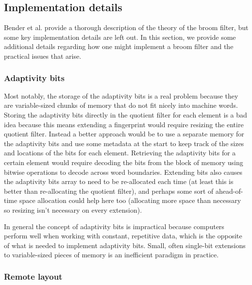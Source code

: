 \documentclass[../paper.tex]{subfiles}
\begin{document}
\subsection{Implementation details}

Bender et al. \cite{broom-filter} provide a thorough description of the theory of
the broom filter, but some key implementation details are left out. In this section,
we provide some additional details regarding how one might implement a broom filter
and the practical issues that arise.

\subsubsection{Adaptivity bits}

Most notably, the storage of the adaptivity bits is a real problem
because they are variable-sized chunks of memory that
do not fit nicely into machine words. Storing the adaptivity
bits directly in the quotient filter for each element is a bad idea
because this means extending a fingerprint would require resizing
the entire quotient filter. Instead a better approach would be
to use a separate memory for the adaptivity bits and use some metadata
at the start to keep track of the sizes and locations of the bits for each element. Retrieving
the adaptivity bits for a certain element would require decoding the bits
from the block of memory using bitwise operations to decode across word boundaries.
Extending bits also causes the adaptivity bits array to need to be re-allocated
each time (at least this is better than re-allocating the quotient filter), and
perhaps some sort of ahead-of-time space allocation could help here too (allocating more space than
necessary so resizing isn't necessary on every extension).

In general the concept of adaptivity bits is impractical because computers perform
well when working with constant, repetitive data, which is the opposite
of what is needed to implement adaptivity bits. Small, often single-bit
extensions to variable-sized pieces of memory is an inefficient paradigm
in practice.

\subsubsection{Remote layout}
\end{document}
